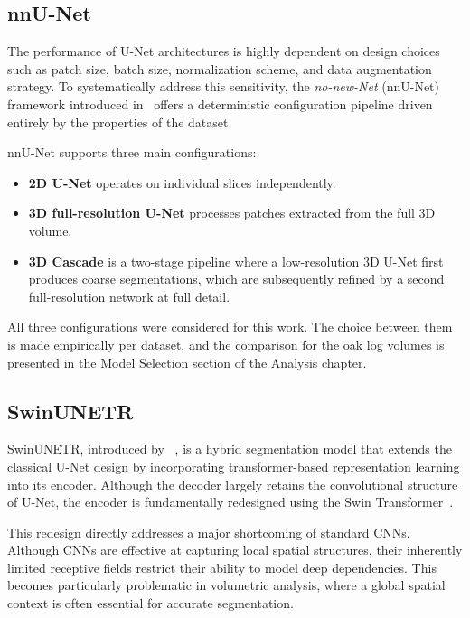 \subsection{nnU-Net}
The performance of U-Net architectures is highly dependent on design choices such as patch size, batch size, normalization scheme, and data augmentation strategy. To systematically address this sensitivity, the \textit{no-new-Net} (nnU-Net) framework introduced in~\cite{isensee2021nnunet} offers a deterministic configuration pipeline driven entirely by the properties of the dataset.

nnU-Net supports three main configurations:

\begin{itemize}
    \item \textbf{2D U-Net} operates on individual slices independently.
    \item \textbf{3D full-resolution U-Net} processes patches extracted from the full 3D volume.
    \item \textbf{3D Cascade} is a two-stage pipeline where a low-resolution 3D U-Net first produces coarse segmentations, which are subsequently refined by a second full-resolution network at full detail.
\end{itemize}

All three configurations were considered for this work. The choice between them is made empirically per dataset, and the comparison for the oak log volumes is presented in the Model Selection section of the Analysis chapter.


\subsection{SwinUNETR}

SwinUNETR, introduced by ~\cite{hatamizadeh2022swinunetr}, is a hybrid segmentation model that
extends the classical U-Net design by incorporating transformer-based
representation learning into its encoder. Although the decoder largely retains
the convolutional structure of U-Net, the encoder is fundamentally redesigned
using the Swin Transformer~\cite{liu2021swin}.

This redesign directly addresses a major shortcoming of standard CNNs. Although
CNNs are effective at capturing local spatial structures, their inherently
limited receptive fields restrict their ability to model deep dependencies. This becomes particularly problematic in volumetric analysis,
where a global spatial context is often essential for accurate segmentation.

